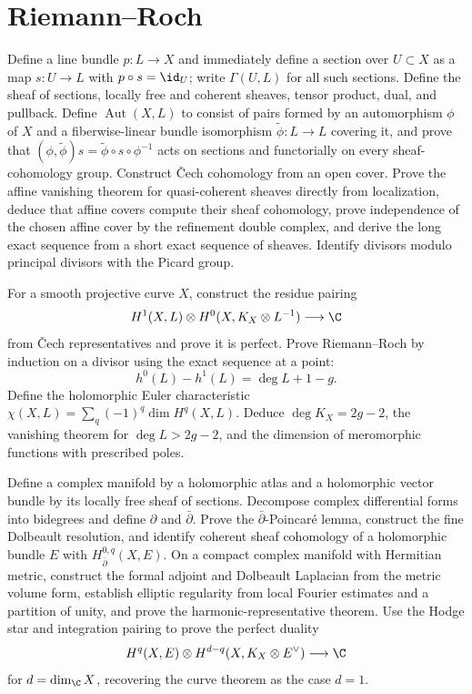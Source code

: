\section{Riemann--Roch}

\begin{exercise}
Define a line bundle $p:L\to X$ and immediately define a section over
$U\subset X$ as a map $s:U\to L$ with $p\circ s=\id_U$; write
$\Gamma(U,L)$ for all such sections.  Define the sheaf of sections, locally
free and coherent sheaves, tensor product, dual, and pullback.  Define
$\operatorname{Aut}(X,L)$ to consist of pairs formed by an automorphism
$\phi$ of $X$ and a fiberwise-linear bundle isomorphism
$\widetilde\phi:L\to L$ covering it, and prove
that
$(\phi,\widetilde\phi)s=\widetilde\phi\circ s\circ\phi^{-1}$ acts on sections
and functorially on every sheaf-cohomology group.  Construct \v Cech
cohomology from an open cover.  Prove the affine vanishing theorem for
quasi-coherent sheaves directly from localization, deduce that affine covers
compute their sheaf cohomology, prove independence of the chosen affine cover
by the refinement double complex, and derive the long exact sequence from a
short exact sequence of sheaves.  Identify divisors modulo principal divisors
with the Picard group.
\end{exercise}

\begin{exercise}
For a smooth projective curve $X$, construct the residue pairing
\[
 H^1(X,L)\otimes H^0(X,K_X\otimes L^{-1})\longrightarrow\C
\]
from \v Cech representatives and prove it is perfect.  Prove Riemann--Roch by
induction on a divisor using the exact sequence at a point:
\[
 h^0(L)-h^1(L)=\deg L+1-g.
\]
Define the holomorphic Euler characteristic
$\chi(X,L)=\sum_q(-1)^q\dim H^q(X,L)$.
Deduce $\deg K_X=2g-2$, the vanishing theorem for $\deg L>2g-2$, and the
dimension of meromorphic functions with prescribed poles.
\end{exercise}

\begin{exercise}
Define a complex manifold by a holomorphic atlas and a holomorphic vector
bundle by its locally free sheaf of sections.  Decompose complex differential
forms into bidegrees and define $\partial$ and $\bar\partial$.  Prove the
$\bar\partial$-Poincar\'e lemma, construct the fine Dolbeault resolution, and
identify coherent sheaf cohomology of a holomorphic bundle $E$ with
$H^{0,q}_{\bar\partial}(X,E)$.  On a compact complex manifold with Hermitian
metric, construct the formal adjoint and Dolbeault Laplacian from the metric
volume form, establish elliptic regularity from local Fourier estimates and a
partition of unity, and prove the harmonic-representative theorem.  Use the
Hodge star and integration pairing to prove the perfect duality
\[
 H^q(X,E)\otimes H^{d-q}(X,K_X\otimes E^\vee)\longrightarrow\C
\]
for $d=\dim_\C X$, recovering the curve theorem as the case $d=1$.
\end{exercise}


